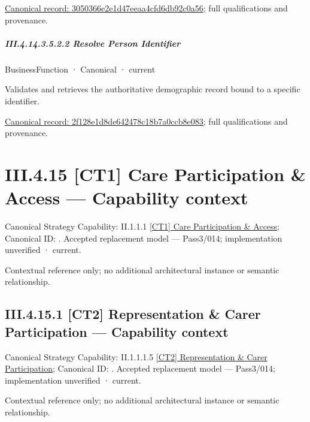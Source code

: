 {\footnotesize \href{../../../../../../../continuum/business/business-function/3050366e2e1d47eeaa4cfd6db92c0a56.md}{Canonical record: 3050366e2e1d47eeaa4cfd6db92c0a56}; full qualifications and provenance.}\par
\subparagraph*{III.4.14.3.5.2.2 Resolve Person Identifier}
\label{navigation:III.4.14.3.5.2.2}

\label{element:2f128e1d8de642478c18b7a0ccb8e083}
{\small BusinessFunction · Canonical · current}\par

Validates and retrieves the authoritative demographic record bound to a specific identifier.


{\footnotesize \href{../../../../../../../continuum/business/business-function/2f128e1d8de642478c18b7a0ccb8e083.md}{Canonical record: 2f128e1d8de642478c18b7a0ccb8e083}; full qualifications and provenance.}\par
\section*{III.4.15 [CT1] Care Participation \& Access — Capability context}
\label{navigation:III.4.15}

{\small Canonical Strategy Capability: II.1.1.1 \hyperref[element:5b06afe075e44cc39236f628c5ada113]{[CT1] Care Participation \& Access}; Canonical ID: \texttt{}. Accepted replacement model — Pass3/014; implementation unverified · current.}\par
Contextual reference only; no additional architectural instance or semantic relationship.\par
\subsection*{III.4.15.1 [CT2] Representation \& Carer Participation — Capability context}
\label{navigation:III.4.15.1}

{\small Canonical Strategy Capability: II.1.1.1.5 \hyperref[element:0a8380fcfc2a4341927b409603a189f3]{[CT2] Representation \& Carer Participation}; Canonical ID: \texttt{}. Accepted replacement model — Pass3/014; implementation unverified · current.}\par
Contextual reference only; no additional architectural instance or semantic relationship.\par
